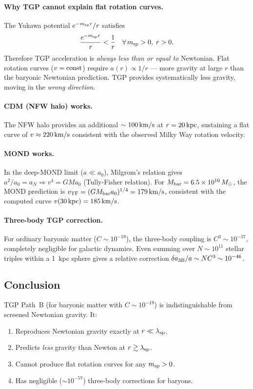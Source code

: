 \paragraph{Why TGP cannot explain flat rotation curves.}
The Yukawa potential $e^{-m_{\rm sp}r}/r$ satisfies
\begin{equation}
  \frac{e^{-m_{\rm sp}r}}{r} < \frac{1}{r} \quad \forall\,m_{\rm sp}>0,\;r>0.
\end{equation}
Therefore TGP acceleration is \emph{always less than or equal to}
Newtonian.  Flat rotation curves ($v={\rm const}$) require
$a(r)\propto1/r$ — more gravity at large $r$ than the baryonic
Newtonian prediction.  TGP provides systematically less gravity,
moving in the \emph{wrong direction}.

\paragraph{CDM (NFW halo) works.}
The NFW halo provides an additional $\sim100\,{\rm km/s}$ at $r=20\,{\rm kpc}$,
sustaining a flat curve of $v\approx220\,{\rm km/s}$ consistent with
the observed Milky Way rotation velocity.

\paragraph{MOND works.}
In the deep-MOND limit ($a\ll a_0$), Milgrom's relation gives
$a^2/a_0=a_N\Rightarrow v^4=GMa_0$ (Tully-Fisher relation).
For $M_{\rm bar}=6.5\times10^{10}\,M_\odot$, the MOND prediction is
$v_{\rm TF}=(GM_{\rm bar}a_0)^{1/4}=179\,{\rm km/s}$, consistent with
the computed curve $v(30\,{\rm kpc})=185\,{\rm km/s}$.

\paragraph{Three-body TGP correction.}
For ordinary baryonic matter ($C\sim10^{-19}$), the three-body
coupling is $C^3\sim10^{-57}$, completely negligible for galactic dynamics.
Even summing over $N\sim10^{11}$ stellar triples within a 1~kpc sphere
gives a relative correction $\delta a_{\rm 3B}/a\sim NC^3\sim10^{-46}$.

\subsection{Conclusion}

TGP Path~B (for baryonic matter with $C\sim10^{-19}$) is
indistinguishable from screened Newtonian gravity.  It:
\begin{enumerate}
\item Reproduces Newtonian gravity exactly at $r\ll\lambda_{\rm sp}$.
\item Predicts \emph{less} gravity than Newton at $r\gtrsim\lambda_{\rm sp}$.
\item Cannot produce flat rotation curves for any $m_{\rm sp}>0$.
\item Has negligible ($\sim10^{-57}$) three-body corrections for baryons.
\end{enumerate}

